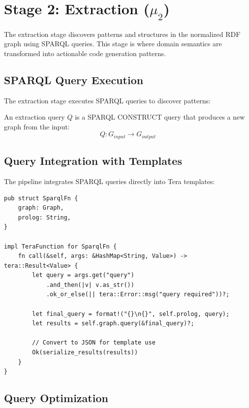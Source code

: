 \section{Stage 2: Extraction (\(\mu_2\))}

The extraction stage discovers patterns and structures in the normalized RDF graph using SPARQL queries. This stage is where domain semantics are transformed into actionable code generation patterns.

\subsection{SPARQL Query Execution}

The extraction stage executes SPARQL queries to discover patterns:

\begin{definition}
    An extraction query \(Q\) is a SPARQL CONSTRUCT query that produces a new graph from the input:
    \begin{equation}
        Q: G_{input} \rightarrow G_{output}
    \end{equation}
\end{definition}

\subsection{Query Integration with Templates}

The pipeline integrates SPARQL queries directly into Tera templates:

\begin{verbatim}
pub struct SparqlFn {
    graph: Graph,
    prolog: String,
}

impl TeraFunction for SparqlFn {
    fn call(&self, args: &HashMap<String, Value>) -> tera::Result<Value> {
        let query = args.get("query")
            .and_then(|v| v.as_str())
            .ok_or_else(|| tera::Error::msg("query required"))?;

        let final_query = format!("{}\n{}", self.prolog, query);
        let results = self.graph.query(&final_query)?;

        // Convert to JSON for template use
        Ok(serialize_results(results))
    }
}
\end{verbatim}

\subsection{Query Optimization}

